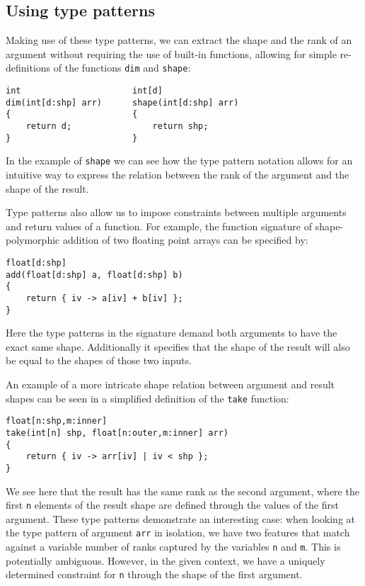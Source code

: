 \subsection{Using type patterns}\label{sec:examples}

Making use of these type patterns, we can extract the shape and the rank of an argument without requiring the use of built-in functions, allowing for simple re-definitions of the functions \texttt{dim} and \texttt{shape}:
\begin{lstlisting}
int                      int[d]
dim(int[d:shp] arr)      shape(int[d:shp] arr)
{                        {
    return d;                return shp;
}                        }
\end{lstlisting}

\noindent
In the example of \texttt{shape} we can see how the type pattern notation allows for an intuitive way to express the relation between the rank of the argument and the shape of the result.

Type patterns also allow us to impose constraints between multiple arguments and return values of a function.
For example, the function signature of shape-polymorphic addition of two floating point arrays can be specified by:
\begin{lstlisting}
float[d:shp]
add(float[d:shp] a, float[d:shp] b)
{
    return { iv -> a[iv] + b[iv] };
}
\end{lstlisting}

\noindent
Here the type patterns in the signature demand both arguments to have the exact same shape.
Additionally it specifies that the shape of the result will also be equal to the shapes of those two inputs.

An example of a more intricate shape relation between argument and result shapes can be seen in a simplified definition of the \texttt{take} function:
\begin{lstlisting}
float[n:shp,m:inner]
take(int[n] shp, float[n:outer,m:inner] arr)
{
    return { iv -> arr[iv] | iv < shp };
}
\end{lstlisting}

\noindent
We see here that the result has the same rank as the second argument, where the first \texttt{n} elements of the result shape are defined through the values of the first argument.
These type patterns demonstrate an interesting case: when looking at the type pattern of argument \texttt{arr} in isolation, we have two features that match against a variable number of ranks captured by the variables \texttt{n} and \texttt{m}.
This is potentially ambiguous.
However, in the given context, we have a uniquely determined constraint for \texttt{n} through the shape of the first argument.


